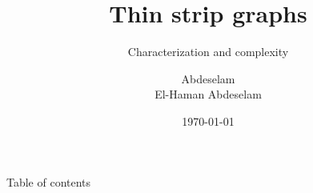 \documentclass{beamer}
\author{Abdeselam\\ El-Haman Abdeselam}
\title{Thin strip graphs}
\subtitle{Characterization and complexity}
\institute{Université Libre de Bruxelles}
\date{\today}
\begin{document}
\frame{\maketitle}
\begin{frame}{Table of contents}
	\tableofcontents
\end{frame}

%
%
%









\end{document}
